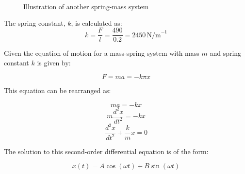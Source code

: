 \documentclass[journal,12pt,twocolumn]{IEEEtran}
\theoremstyle{remark}
\begin{document}
\begin{figure}
    \centering
    \caption{Illustration of another spring-mass system}
    \label{fig:another-spring-mass-system}
\end{figure}



The spring constant, \( k \), is calculated as:
\begin{equation}
k = \frac{F}{l} = \frac{490}{0.2} = 2450 \, \text{N/m}^{-1}
\end{equation}

	Given the equation of motion for a mass-spring system with mass $m$ and spring constant $k$ is given by:

\begin{equation} 
	F = ma = -k\pi x
\end{equation}

This equation can be rearranged as:

\begin{equation}
	ma = -kx 
\end{equation}
\begin{equation}
	m\frac{d^2x}{dt^2} = -kx 
\end{equation}
\begin{equation}
	\frac{d^2x}{dt^2} + \frac{k}{m}x = 0 
\end{equation}

The solution to this second-order differential equation is of the form:

\begin{equation}
x(t) = A\cos(\omega t) + B\sin(\omega t) 
\end{equation}
\end{document}
